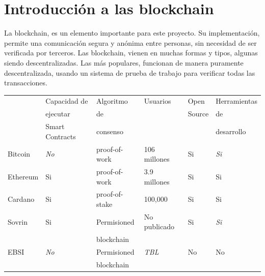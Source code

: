 \section{Introducción a las blockchain}
La blockchain, es un elemento importante para este proyecto. Su implementación, permite una comunicación segura y anónima entre personas, sin necesidad de ser verificada por terceros. Las blockchain, vienen en muchas formas y tipos, algunas siendo descentralizadas. Las más populares, funcionan de manera puramente descentralizada, usando un sistema de prueba de trabajo para verificar todas las transacciones.
    \begin{table}[h!]
        \begin{tabular}{|l|l|l|l|l|l|}
        \hline
                 & Capacidad de             & Algoritmo                 & Usuarios      & Open          & Herramientas               \\
                 & ejecutar                 & de                        &               & Source        & de                         \\
                 & Smart Contracts          & consenso                  &               &               & desarrollo                 \\ \hline
        Bitcoin  & \textit{No}              & proof-of-work             & 106 millones  & Si            & \textit{Si}                \\ \hline
        Ethereum & Si                       & proof-of-work             & 3.9 millones  & Si            & Si                         \\ \hline
        Cardano  & Si                       & proof-of-stake            & 100,000       & Si            & Si                         \\ \hline
        Sovrin   & Si                       & Permisioned               & No publicado  & Si            & \textit{Si}                \\ 
                 &                          & blockchain \cite{web:perm}&               &               &                            \\ \hline
        EBSI     & \textit{No}              & Permisioned               & \textit{TBL}  & No            & No                         \\ 
                 &                          & blockchain \cite{web:perm}&               &               &                            \\ \hline
        \end{tabular}
        \end{table}
